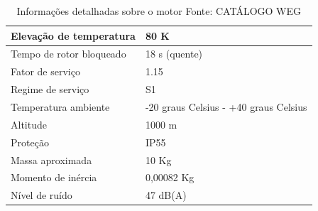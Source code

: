 \begin{table}[h]
\begin{center}
\begin{tabular}{|p{5cm}|p{5cm}|}
                Elevação de temperatura & 80 K
                \\ \hline
                Tempo de rotor bloqueado & 18 s (quente)
                \\ \hline
                Fator de serviço & 1.15
                \\ \hline
                Regime de serviço & S1
                \\ \hline
                Temperatura ambiente & -20 graus Celsius - +40 graus Celsius
                \\ \hline
                Altitude & 1000 m
                \\ \hline
                Proteção & IP55
                \\ \hline
                Massa aproximada & 10 Kg
                \\ \hline
                Momento de inércia & 0,00082 Kg
                \\ \hline
                Nível de ruído & 47 dB(A)
                \\ \hline
              \end{tabular}
              \caption[Informações detalhadas sobre o motor]{Informações detalhadas sobre o motor
              \protect Fonte: CATÁLOGO WEG }
            \label{tabela_info_motor}
        \end{center}
    \end{table}





